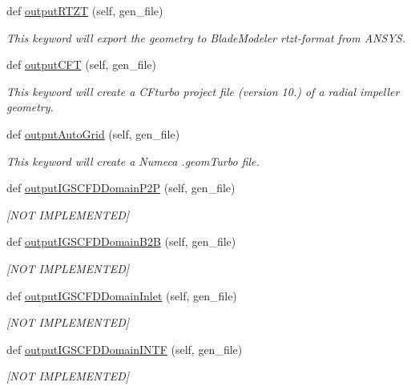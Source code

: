 \begin{DoxyCompactItemize}
def \hyperlink{a00071_a27407b1e60e56fceec34147b9b793a74}{output\+R\+T\+ZT} (self, gen\+\_\+file)
\begin{DoxyCompactList}\small\item\em This keyword will export the geometry to Blade\+Modeler rtzt-\/format from A\+N\+S\+YS. \end{DoxyCompactList}\item 
def \hyperlink{a00071_ad727ca92f2959a8d915939c73f3dbff1}{output\+C\+FT} (self, gen\+\_\+file)
\begin{DoxyCompactList}\small\item\em This keyword will create a C\+Fturbo project file (version 10.) of a radial impeller geometry. \end{DoxyCompactList}\item 
def \hyperlink{a00071_a61f9db1d33a2cb583c3f779a94ec700d}{output\+Auto\+Grid} (self, gen\+\_\+file)
\begin{DoxyCompactList}\small\item\em This keyword will create a Numeca .geom\+Turbo file. \end{DoxyCompactList}\item 
def \hyperlink{a00071_aa7a1b9b7db9021015b02a691075d88e3}{output\+I\+G\+S\+C\+F\+D\+Domain\+P2P} (self, gen\+\_\+file)
\begin{DoxyCompactList}\small\item\em \mbox{[}N\+OT I\+M\+P\+L\+E\+M\+E\+N\+T\+ED\mbox{]} \end{DoxyCompactList}\item 
def \hyperlink{a00071_a8e556016279f9aabdabb9b6f708c95cb}{output\+I\+G\+S\+C\+F\+D\+Domain\+B2B} (self, gen\+\_\+file)
\begin{DoxyCompactList}\small\item\em \mbox{[}N\+OT I\+M\+P\+L\+E\+M\+E\+N\+T\+ED\mbox{]} \end{DoxyCompactList}\item 
def \hyperlink{a00071_a1a577ed1880def26fc13d02701e9346a}{output\+I\+G\+S\+C\+F\+D\+Domain\+Inlet} (self, gen\+\_\+file)
\begin{DoxyCompactList}\small\item\em \mbox{[}N\+OT I\+M\+P\+L\+E\+M\+E\+N\+T\+ED\mbox{]} \end{DoxyCompactList}\item 
def \hyperlink{a00071_aa16a1dab2d93130c1cc0b4c24ec2caef}{output\+I\+G\+S\+C\+F\+D\+Domain\+I\+N\+TF} (self, gen\+\_\+file)
\begin{DoxyCompactList}\small\item\em \mbox{[}N\+OT I\+M\+P\+L\+E\+M\+E\+N\+T\+ED\mbox{]} \end{DoxyCompactList}\item 

\end{DoxyCompactItemize}
